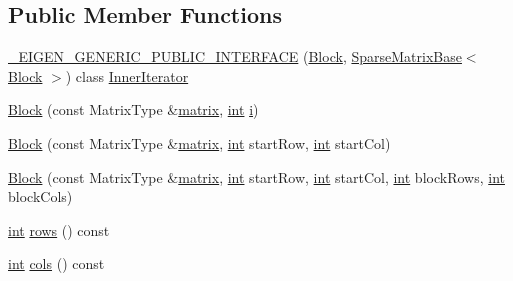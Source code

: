 \subsection*{Public Member Functions}
\begin{DoxyCompactItemize}
\item 
\hyperlink{class_block_3_01_matrix_type_00_01_block_rows_00_01_block_cols_00_01_packet_access_00_01_is_sparse_01_4_a82ec82189575d2a1c1d866302efd0ce8}{\-\_\-\-E\-I\-G\-E\-N\-\_\-\-G\-E\-N\-E\-R\-I\-C\-\_\-\-P\-U\-B\-L\-I\-C\-\_\-\-I\-N\-T\-E\-R\-F\-A\-C\-E} (\hyperlink{class_block}{Block}, \hyperlink{class_sparse_matrix_base}{Sparse\-Matrix\-Base}$<$ \hyperlink{class_block}{Block} $>$) class \hyperlink{class_inner_iterator}{Inner\-Iterator}
\item 
\hyperlink{class_block_3_01_matrix_type_00_01_block_rows_00_01_block_cols_00_01_packet_access_00_01_is_sparse_01_4_adde9ad397bb7f9e8a34321ff0b9002e2}{Block} (const Matrix\-Type \&\hyperlink{glext_8h_a7b24a3f2f56eb1244ae69dacb4fecb6f}{matrix}, \hyperlink{ioapi_8h_a787fa3cf048117ba7123753c1e74fcd6}{int} \hyperlink{uavobjecttemplate_8m_a6f6ccfcf58b31cb6412107d9d5281426}{i})
\item 
\hyperlink{class_block_3_01_matrix_type_00_01_block_rows_00_01_block_cols_00_01_packet_access_00_01_is_sparse_01_4_ab8ba09c18c374d14888da26e3f8a9bf3}{Block} (const Matrix\-Type \&\hyperlink{glext_8h_a7b24a3f2f56eb1244ae69dacb4fecb6f}{matrix}, \hyperlink{ioapi_8h_a787fa3cf048117ba7123753c1e74fcd6}{int} start\-Row, \hyperlink{ioapi_8h_a787fa3cf048117ba7123753c1e74fcd6}{int} start\-Col)
\item 
\hyperlink{class_block_3_01_matrix_type_00_01_block_rows_00_01_block_cols_00_01_packet_access_00_01_is_sparse_01_4_a82b3e2ef157c7586a93dc2b9a7cb131a}{Block} (const Matrix\-Type \&\hyperlink{glext_8h_a7b24a3f2f56eb1244ae69dacb4fecb6f}{matrix}, \hyperlink{ioapi_8h_a787fa3cf048117ba7123753c1e74fcd6}{int} start\-Row, \hyperlink{ioapi_8h_a787fa3cf048117ba7123753c1e74fcd6}{int} start\-Col, \hyperlink{ioapi_8h_a787fa3cf048117ba7123753c1e74fcd6}{int} block\-Rows, \hyperlink{ioapi_8h_a787fa3cf048117ba7123753c1e74fcd6}{int} block\-Cols)
\item 
\hyperlink{ioapi_8h_a787fa3cf048117ba7123753c1e74fcd6}{int} \hyperlink{class_block_3_01_matrix_type_00_01_block_rows_00_01_block_cols_00_01_packet_access_00_01_is_sparse_01_4_ab1164de01c920b3a8bd8f10cad56232f}{rows} () const 
\item 
\hyperlink{ioapi_8h_a787fa3cf048117ba7123753c1e74fcd6}{int} \hyperlink{class_block_3_01_matrix_type_00_01_block_rows_00_01_block_cols_00_01_packet_access_00_01_is_sparse_01_4_a53f8ae9194ea7bcfce64a18aa0415f52}{cols} () const 

\end{DoxyCompactItemize}
